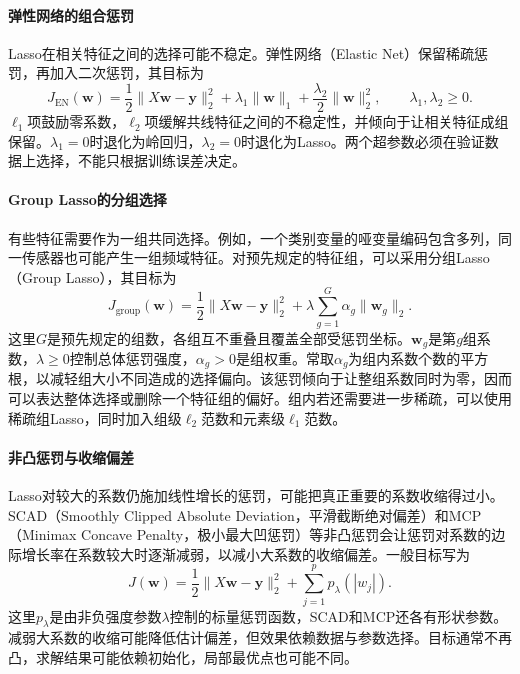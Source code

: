 \paragraph{弹性网络的组合惩罚}
Lasso在相关特征之间的选择可能不稳定。弹性网络（Elastic Net）保留稀疏惩罚，再加入二次惩罚，其目标为
\begin{equation}
 J_{\mathrm{EN}}(\bm w)=\frac12\|X\bm w-\bm y\|_2^2
 +\lambda_1\|\bm w\|_1+\frac{\lambda_2}{2}\|\bm w\|_2^2,
 \qquad \lambda_1,\lambda_2\geq0.
 \label{eq:linear-elastic-net-objective}
\end{equation}
$\ell_1$项鼓励零系数，$\ell_2$项缓解共线特征之间的不稳定性，并倾向于让相关特征成组保留。$\lambda_1=0$时退化为岭回归，$\lambda_2=0$时退化为Lasso。两个超参数必须在验证数据上选择，不能只根据训练误差决定。

\paragraph{Group Lasso的分组选择}
有些特征需要作为一组共同选择。例如，一个类别变量的哑变量编码包含多列，同一传感器也可能产生一组频域特征。对预先规定的特征组，可以采用分组Lasso（Group Lasso），其目标为
\begin{equation}
 J_{\mathrm{group}}(\bm w)=\frac12\|X\bm w-\bm y\|_2^2
 +\lambda\sum_{g=1}^G\alpha_g\|\bm w_g\|_2.
 \label{eq:linear-group-lasso-objective}
\end{equation}
这里$G$是预先规定的组数，各组互不重叠且覆盖全部受惩罚坐标。$\bm w_g$是第$g$组系数，$\lambda\geq0$控制总体惩罚强度，$\alpha_g>0$是组权重。常取$\alpha_g$为组内系数个数的平方根，以减轻组大小不同造成的选择偏向。该惩罚倾向于让整组系数同时为零，因而可以表达整体选择或删除一个特征组的偏好。组内若还需要进一步稀疏，可以使用稀疏组Lasso，同时加入组级$\ell_2$范数和元素级$\ell_1$范数。

\paragraph{非凸惩罚与收缩偏差}
Lasso对较大的系数仍施加线性增长的惩罚，可能把真正重要的系数收缩得过小。SCAD（Smoothly Clipped Absolute Deviation，平滑截断绝对偏差）和MCP（Minimax Concave Penalty，极小最大凹惩罚）等非凸惩罚会让惩罚对系数的边际增长率在系数较大时逐渐减弱，以减小大系数的收缩偏差。一般目标写为
\begin{equation}
 J(\bm w)=\frac12\|X\bm w-\bm y\|_2^2+\sum_{j=1}^p p_\lambda(|w_j|).
 \label{eq:linear-nonconvex-penalty}
\end{equation}
这里$p_\lambda$是由非负强度参数$\lambda$控制的标量惩罚函数，SCAD和MCP还各有形状参数。减弱大系数的收缩可能降低估计偏差，但效果依赖数据与参数选择。目标通常不再凸，求解结果可能依赖初始化，局部最优点也可能不同。

